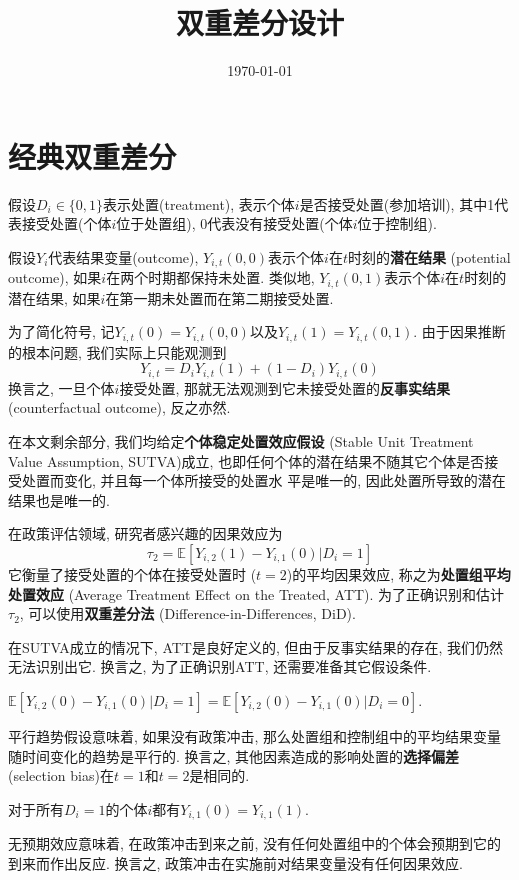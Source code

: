\documentclass[cn,blue,14pt,screen,bibstyle=gb7714-2015]{elegantnote}
\title{双重差分设计}
\date{\today}
\newcommand{\E}{\mathbb{E}}
\begin{document}
\maketitle
\newpage

\section{经典双重差分}

假设$D_i\in \{0,1\}$表示处置(treatment), 表示个体$i$是否接受处置(参加培训), 其中1代表接受处置(个体$i$位于处置组), 0代表没有接受处置(个体$i$位于控制组).


假设$Y_i$代表结果变量(outcome), $Y_{i,t}(0,0)$表示个体$i$在$t$时刻的\textbf{潜在结果} (potential outcome), 如果$i$在两个时期都保持未处置. 类似地, $Y_{i,t}(0,1)$表示个体$i$在$t$时刻的潜在结果, 如果$i$在第一期未处置而在第二期接受处置.

为了简化符号, 记$Y_{i,t}(0)=Y_{i,t}(0,0)$以及$Y_{i,t}(1)=Y_{i,t}(0,1)$. 由于因果推断的根本问题, 我们实际上只能观测到
$$Y_{i,t}=D_iY_{i,t}(1)+(1-D_i)Y_{i,t}(0)$$
换言之, 一旦个体$i$接受处置, 那就无法观测到它未接受处置的\textbf{反事实结果} (counterfactual outcome), 反之亦然.

在本文剩余部分, 我们均给定\textbf{个体稳定处置效应假设} (Stable Unit Treatment Value Assumption, SUTVA)成立, 也即任何个体的潜在结果不随其它个体是否接受处置而变化, 并且每一个体所接受的处置水 平是唯一的, 因此处置所导致的潜在结果也是唯一的.

在政策评估领域, 研究者感兴趣的因果效应为
$$\tau_2=\E[Y_{i,2}(1)-Y_{i,1}(0)|D_i=1]$$
它衡量了接受处置的个体在接受处置时 ($t=2$)的平均因果效应, 称之为\textbf{处置组平均处置效应} (Average Treatment Effect on the Treated, ATT). 为了正确识别和估计$\tau_2$, 可以使用\textbf{双重差分法} (Difference-in-Differences, DiD).

在SUTVA成立的情况下, ATT是良好定义的, 但由于反事实结果的存在, 我们仍然无法识别出它. 换言之, 为了正确识别ATT, 还需要准备其它假设条件.

\begin{definition}[平行趋势]
  $\E[Y_{i,2}(0)-Y_{i,1}(0)|D_i=1]=\E[Y_{i,2}(0)-Y_{i,1}(0)|D_i=0]$.
\end{definition}
平行趋势假设意味着, 如果没有政策冲击, 那么处置组和控制组中的平均结果变量随时间变化的趋势是平行的. 换言之, 其他因素造成的影响处置的\textbf{选择偏差} (selection bias)在$t=1$和$t=2$是相同的.

\begin{definition}[无预期效应]
对于所有$D_i=1$的个体$i$都有$Y_{i,1}(0)=Y_{i,1}(1)$.
\end{definition}
无预期效应意味着, 在政策冲击到来之前, 没有任何处置组中的个体会预期到它的到来而作出反应. 换言之, 政策冲击在实施前对结果变量没有任何因果效应.
\end{document}
